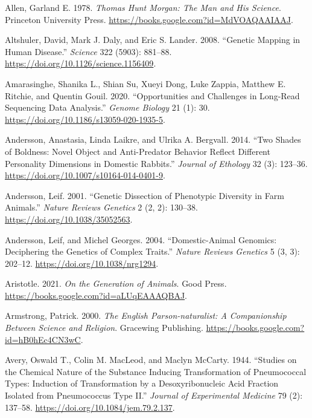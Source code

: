 \documentclass[
]{book}
\newlength{\cslhangindent}
\newlength{\cslentryspacingunit} %
\newenvironment{CSLReferences}[2] %
 {%
  \setlength{\parindent}{0pt}
  \ifodd #1
  \let\oldpar\par
  \def\par{\hangindent=\cslhangindent\oldpar}
  \fi
  \setlength{\parskip}{#2\cslentryspacingunit}
 }%
 {}
\begin{document}
\begin{CSLReferences}{1}{0}
\leavevmode{}%
Allen, Garland E. 1978. \emph{Thomas {Hunt Morgan}: {The Man} and {His Science}}. {Princeton University Press}. \url{https://books.google.com?id=MdVOAQAAIAAJ}.

\leavevmode{}%
Altshuler, David, Mark J. Daly, and Eric S. Lander. 2008. {``Genetic {Mapping} in {Human Disease}.''} \emph{Science} 322 (5903): 881--88. \url{https://doi.org/10.1126/science.1156409}.

\leavevmode{}%
Amarasinghe, Shanika L., Shian Su, Xueyi Dong, Luke Zappia, Matthew E. Ritchie, and Quentin Gouil. 2020. {``Opportunities and Challenges in Long-Read Sequencing Data Analysis.''} \emph{Genome Biology} 21 (1): 30. \url{https://doi.org/10.1186/s13059-020-1935-5}.

\leavevmode{}%
Andersson, Anastasia, Linda Laikre, and Ulrika A. Bergvall. 2014. {``Two Shades of Boldness: Novel Object and Anti-Predator Behavior Reflect Different Personality Dimensions in Domestic Rabbits.''} \emph{Journal of Ethology} 32 (3): 123--36. \url{https://doi.org/10.1007/s10164-014-0401-9}.

\leavevmode{}%
Andersson, Leif. 2001. {``Genetic Dissection of Phenotypic Diversity in Farm Animals.''} \emph{Nature Reviews Genetics} 2 (2, 2): 130--38. \url{https://doi.org/10.1038/35052563}.

\leavevmode{}%
Andersson, Leif, and Michel Georges. 2004. {``Domestic-Animal Genomics: Deciphering the Genetics of Complex Traits.''} \emph{Nature Reviews Genetics} 5 (3, 3): 202--12. \url{https://doi.org/10.1038/nrg1294}.

\leavevmode{}%
Aristotle. 2021. \emph{On the {Generation} of {Animals}}. {Good Press}. \url{https://books.google.com?id=aLUqEAAAQBAJ}.

\leavevmode{}%
Armstrong, Patrick. 2000. \emph{The {English Parson-naturalist}: {A Companionship Between Science} and {Religion}}. {Gracewing Publishing}. \url{https://books.google.com?id=hB0hEc4CN3wC}.

\leavevmode{}%
Avery, Oswald T., Colin M. MacLeod, and Maclyn McCarty. 1944. {``Studies on the Chemical Nature of the Substance Inducing Transformation of Pneumococcal Types: {Induction} of Transformation by a Desoxyribonucleic Acid Fraction Isolated from Pneumococcus Type {II}.''} \emph{Journal of Experimental Medicine} 79 (2): 137--58. \url{https://doi.org/10.1084/jem.79.2.137}.


\end{CSLReferences}
\end{document}
